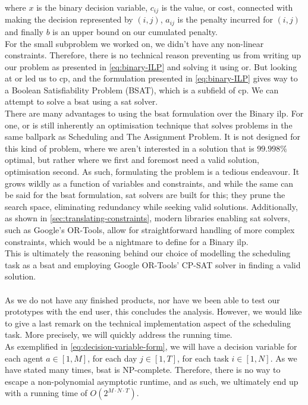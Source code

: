 where \(x\) is the binary decision variable, \(c_{ij}\) is the value, or cost, connected with making the decision represented by \( (i,j) \), \( a_{ij} \) is the penalty incurred for \( (i,j) \) and finally \(b\) is an upper bound on our cumulated penalty.
\\
For the small subproblem we worked on, we didn't have any non-linear constraints. Therefore, there is no technical reason preventing us from writing up our problem as presented in \autoref{eq:binary-ILP} and solving it using \acrshort{or}. But looking at \acrshort{or} led us to \acrshort{cp}, and the formulation presented in \autoref{eq:binary-ILP} gives way to a Boolean Satisfiability Problem (BSAT), which is a subfield of \acrshort{cp}. We can attempt to solve a \acrshort{bsat} using a \acrshort{sat} solver.
\\
There are many advantages to using the \acrshort{bsat} formulation over the Binary \acrshort{ilp}. For one, \acrshort{or} is still inherently an optimisation technique that solves problems in the same ballpark as Scheduling and The Assignment Problem. It is not designed for this kind of problem, where we aren't interested in a solution that is \(99.998\%\) optimal, but rather where we first and foremost need a valid solution, optimisation second. As such, formulating the problem is a tedious endeavour. It grows wildly as a function of variables and constraints, and while the same can be said for the \acrshort{bsat} formulation, \acrshort{sat} solvers are built for this; they prune the search space, eliminating redundancy while seeking valid solutions. Additionally, as shown in \autoref{sec:translating-constraints}, modern libraries enabling \acrshort{sat} solvers, such as Google's OR-Tools, allow for straightforward handling of more complex constraints, which would be a nightmare to define for a Binary \acrshort{ilp}.
\\
This is ultimately the reasoning behind our choice of modelling the scheduling task as a \acrshort{bsat} and employing Google OR-Tools' CP-SAT solver in finding a valid solution.
\\
\\
As we do not have any finished products, nor have we been able to test our prototypes with the end user, this concludes the analysis. However, we would like to give a last remark on the technical implementation aspect of the scheduling task. More precisely, we will quickly address the running time.
\\
As exemplified in \autoref{eq:decision-variable-form}, we will have a decision variable for each agent \(a \in [1, M]\), for each day \(j \in [1, T]\), for each task \(i \in [1, N]\). As we have stated many times, \acrshort{bsat} is NP-complete. Therefore, there is no way to escape a non-polynomial asymptotic runtime, and as such, we ultimately end up with a running time of \(O(2^{M \cdot N \cdot T})\).

